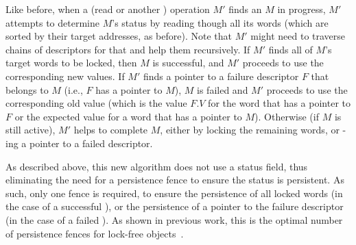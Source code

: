 Like before, when a (read or another \mcas{}) operation $M'$ finds an \mcas{} $M$ in progress, $M'$ attempts to determine $M$'s status by reading though all its words (which are sorted by their target addresses, as before).
Note that $M'$ might need to traverse chains of descriptors for that and help them recursively.
If $M'$ finds all of $M$'s target words to be locked, then $M$ is successful, and $M'$ proceeds to use the corresponding new values.
If $M'$ finds a pointer to a failure descriptor $F$ that belongs to $M$ (i.e., $F$ has a pointer to $M$), $M$ is failed and $M'$ proceeds to use the corresponding old value (which is the value $F.V$ for the word that has a pointer to $F$ or the expected value for a word that has a pointer to $M$).
Otherwise (if $M$ is still active), $M'$ helps to complete $M$, either by locking the remaining words, or \cas{}-ing a pointer to a failed descriptor.

As described above, this new algorithm does not use a status field, thus eliminating the need for a persistence fence to ensure the status is persistent. As such, only one fence is required, to ensure the persistence of all locked words (in the case of a successful \mcas{}), or the persistence of a pointer to the failure descriptor (in the case of a failed \mcas{}). As shown in previous work, this is the optimal number of persistence fences for lock-free objects~\cite{cohen18}.





 
